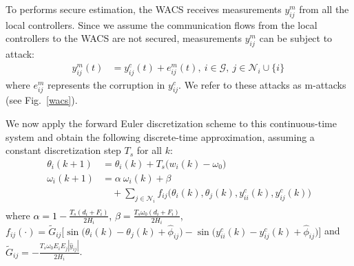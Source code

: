 To performs secure estimation, the WACS receives measurements $y^m_{ij}$ from all the local controllers. Since we assume the communication flows from the local controllers to the WACS are not secured, measurements $y^m_{ij}$ can be subject to attack:
\begin{equation}\label{Eq:ym}
\begin{aligned}
y^m_{ij}(t) &= y^c_{ij}(t) + e^m_{ij}(t),~i \in \mathcal{G},~j \in \mathcal{N}_i \cup \{i\} \,
\end{aligned}
\end{equation}
where $e^m_{ij}$ represents the corruption in $y^c_{ij}$. We refer to these attacks as m-attacks (see Fig.~\ref{wacs}).

We now apply the forward Euler discretization scheme to this continuous-time system and obtain the following discrete-time approximation, assuming a constant discretization step $T_s$ for all $k$:
\begin{equation}
\begin{aligned}
\theta_i (k+1) &= \theta_i(k) + T_s \big(w_i(k) - \omega_0\big) \\
\omega_i(k+1)
	&= \alpha~\omega_i(k) + \beta \\
	& \quad + \sum_{j\in \mathcal{N}_i} f_{ij} \big(\theta_i(k), \theta_j(k), y^c_{ii}(k), y^c_{ij}(k)\big) \\
\end{aligned}
\end{equation}
where \textcolor{black}{$\alpha = 1- \frac{T_s (d_i + F_i)}{2H_i}$, $\beta = \frac{T_s  \omega_0(d_i+F_i)}{2H_i}$}, $f_{ij} (\cdot) = \tilde G_{ij} \big[ \sin \big(\theta_i(k) - \theta_j(k) + \widehat{\phi}_{ij}\big) - \sin \big(y^c_{ii}(k) - y^c_{ij}(k)+\widehat{\phi}_{ij}\big) \big] $
and $\tilde G_{ij} = - \frac{T_s \omega_0 E_i E_j |\widehat{y}_{ij}|}{2H_i}$.

